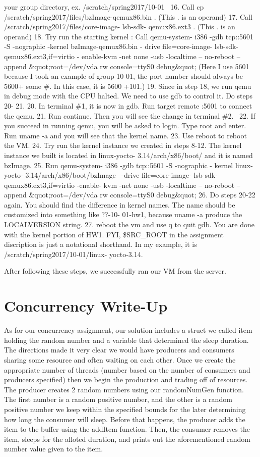 \documentclass[10pt,draftclsnofoot,onecolumn]{IEEEtran}
\begin{document}
{your group directory, ex. /scratch/spring2017/10-01 
16. Call cp /scratch/spring2017/files/bzImage-qemux86.bin
. (This . is an operand)
17. Call  /scratch/spring2017/files/core-image- lsb-sdk-
qemux86.ext3 . (This . is an operand)
18. Try run the starting kernel : Call qemu-system- i386 -gdb
tcp::5601 -S -nographic -kernel bzImage-qemux86.bin -
drive file=core-image- lsb-sdk- qemux86.ext3,if=virtio -
enable-kvm -net none -usb -localtime -- no-reboot -- append
\&quot;root=/dev/vda rw console=ttyS0 debug\&quot; (Here I use 5601
because I took an example of group 10-01, the port number
should always be 5600+ some \#. In this case, it is 5600
+101.)
19. Since in step 18, we run qemu in debug mode with the
CPU halted. We need to use gdb to control it. Do steps 20-
21.
20. In terminal \#1, it is now in gdb. Run target remote :5601
to connect the qemu.
21. Run continue. Then you will see the change in terminal
\#2. 
22. If you succeed in running qemu, you will be asked to
login. Type root and enter. Run uname -a and you will see
that the kernel name.
23. Use reboot to reboot the VM.
24. Try run the kernel instance we created in steps 8-12.
The kernel instance we built is located in linux-yocto-
3.14/arch/x86/boot/ and it is named bzImage.
25. Run qemu-system- i386 -gdb tcp::5601 -S -nographic -
kernel linux-yocto- 3.14/arch/x86/boot/bzImage  -drive
file=core-image- lsb-sdk- qemux86.ext3,if=virtio -enable- kvm
-net none -usb -localtime -- no-reboot -- append
\&quot;root=/dev/vda rw console=ttyS0 debug\&quot;
26. Do steps 20-22 again. You should find the difference in
kernel names. The name should be customized into
something like ??-10- 01-hw1, because uname -a produce
the LOCALVERSION string.
27. reboot the vm and use q to quit gdb. You are done with
the kernel portion of HW1.
FYI, \$SRC\_ROOT in the assignment discription is just a notational
shorthand. In my example, it is /scratch/spring2017/10-01/linux-
yocto-3.14.

After following these steps, we successfully ran our VM from the server. 
\vspace{5mm}
\section{Concurrency Write-Up}
As for our concurrency assignment, our solution includes a struct we called item holding the random number and a variable that determined the sleep duration. The directions made it very clear we would have producers and consumers sharing some resource and often waiting on each other. Once we create the appropriate number of threads (number based on the number of consumers and producers specified) then we begin the production and trading off of resources. The producer creates 2 random numbers using our randomNumGen function. The first number is a random positive number, and the other is a random positive number we keep within the specified bounds for the later determining how long the consumer will sleep. Before that happens, the producer adds the item to the buffer using the addItem function. Then, the consumer removes the item, sleeps for the alloted duration, and prints out the aforementioned random number value given to the item. 

}
\end{document}
